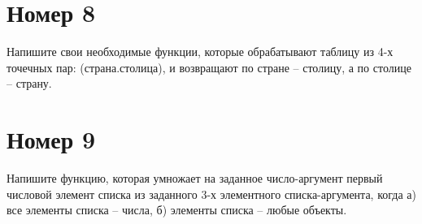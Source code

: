 \section{Номер 8}

Напишите свои необходимые функции, которые обрабатывают таблицу
из 4-х точечных пар: (страна.столица), и возвращают по стране --
столицу, а по столице -- страну.

\begin{figure}[H]
    \begin{listingbox}{}
        
    \end{listingbox}
    \label{lst:8}
\end{figure}

\section{Номер 9}

Напишите функцию, которая умножает на заданное число-аргумент
первый числовой элемент списка из заданного 3-х элементного 
списка-аргумента, когда а) все элементы списка -- числа,
б) элементы списка -- любые объекты.

\begin{figure}[H]
    \begin{listingbox}{}
        
    \end{listingbox}
    \label{lst:9}
\end{figure}